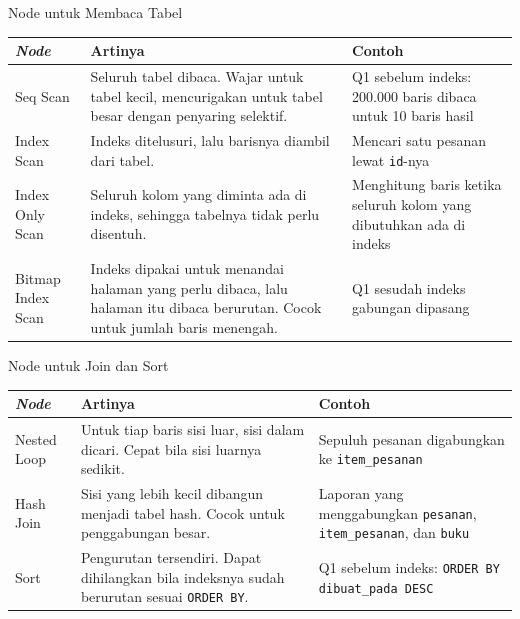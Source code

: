 \documentclass[aspectratio=169, table, 12pt]{beamer}
\begin{document}
\begin{frame}{{\Large Node untuk Membaca Tabel}}
  \vspace{20pt}
  \centering
  {\footnotesize
  \begin{tabularx}{\textwidth}{lYY}
    \hline
    \textbf{\textit{Node}} & \textbf{Artinya} & \textbf{Contoh} \\
    \hline
    Seq Scan & Seluruh tabel dibaca. Wajar untuk tabel kecil, mencurigakan untuk tabel besar dengan penyaring selektif. & Q1 sebelum indeks: 200.000 baris dibaca untuk 10 baris hasil \\
    \hline
    Index Scan & Indeks ditelusuri, lalu barisnya diambil dari tabel. & Mencari satu pesanan lewat \texttt{id}-nya \\
    \hline
    Index Only Scan & Seluruh kolom yang diminta ada di indeks, sehingga tabelnya tidak perlu disentuh. & Menghitung baris ketika seluruh kolom yang dibutuhkan ada di indeks \\
    \hline
    Bitmap Index Scan & Indeks dipakai untuk menandai halaman yang perlu dibaca, lalu halaman itu dibaca berurutan. Cocok untuk jumlah baris menengah. & Q1 sesudah indeks gabungan dipasang \\
    \hline
  \end{tabularx}}
\end{frame}

\begin{frame}{{\Large Node untuk Join dan Sort}}
  \vspace{5pt}
  \centering
  {\footnotesize
  \begin{tabularx}{\textwidth}{lYY}
    \hline
    \textbf{\textit{Node}} & \textbf{Artinya} & \textbf{Contoh} \\
    \hline
    Nested Loop & Untuk tiap baris sisi luar, sisi dalam dicari. Cepat bila sisi luarnya sedikit. & Sepuluh pesanan digabungkan ke \texttt{item\_pesanan} \\
    \hline
    Hash Join & Sisi yang lebih kecil dibangun menjadi tabel hash. Cocok untuk penggabungan besar. & Laporan yang menggabungkan \texttt{pesanan}, \texttt{item\_pesanan}, dan \texttt{buku} \\
    \hline
    Sort & Pengurutan tersendiri. Dapat dihilangkan bila indeksnya sudah berurutan sesuai \texttt{ORDER BY}. & Q1 sebelum indeks: \texttt{ORDER BY dibuat\_pada DESC} \\
    \hline
  \end{tabularx}}
\end{frame}
\end{document}

